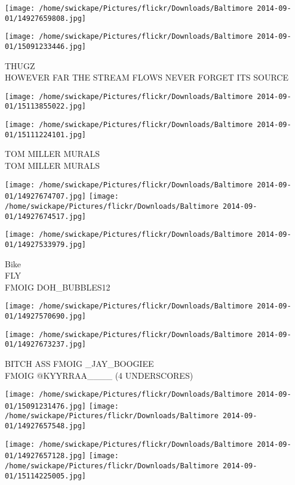 \documentclass[10pt,letterpaper]{article}
\begin{document}
\texttt{[image: /home/swickape/Pictures/flickr/Downloads/Baltimore 2014-09-01/14927659808.jpg]}

\vspace{0.25in}
\texttt{[image: /home/swickape/Pictures/flickr/Downloads/Baltimore 2014-09-01/15091233446.jpg]}

THUGZ\\
HOWEVER FAR THE STREAM FLOWS NEVER FORGET ITS SOURCE
\pagebreak

\texttt{[image: /home/swickape/Pictures/flickr/Downloads/Baltimore 2014-09-01/15113855022.jpg]}

\vspace{0.25in}
\texttt{[image: /home/swickape/Pictures/flickr/Downloads/Baltimore 2014-09-01/15111224101.jpg]}

TOM MILLER MURALS\\
TOM MILLER MURALS
\pagebreak

\texttt{[image: /home/swickape/Pictures/flickr/Downloads/Baltimore 2014-09-01/14927674707.jpg]}
\texttt{[image: /home/swickape/Pictures/flickr/Downloads/Baltimore 2014-09-01/14927674517.jpg]}

\vspace{0.25in}
\texttt{[image: /home/swickape/Pictures/flickr/Downloads/Baltimore 2014-09-01/14927533979.jpg]}

Bike\\
FLY\\
FMOIG DOH\_BUBBLES12
\pagebreak

\texttt{[image: /home/swickape/Pictures/flickr/Downloads/Baltimore 2014-09-01/14927570690.jpg]}

\vspace{0.25in}
\texttt{[image: /home/swickape/Pictures/flickr/Downloads/Baltimore 2014-09-01/14927673237.jpg]}

BITCH ASS FMOIG \_JAY\_BOOGIEE\\
FMOIG @KYYRRAA\_\_\_\_ (4 UNDERSCORES)
\pagebreak

\texttt{[image: /home/swickape/Pictures/flickr/Downloads/Baltimore 2014-09-01/15091231476.jpg]}
\texttt{[image: /home/swickape/Pictures/flickr/Downloads/Baltimore 2014-09-01/14927657548.jpg]}

\texttt{[image: /home/swickape/Pictures/flickr/Downloads/Baltimore 2014-09-01/14927657128.jpg]}
\texttt{[image: /home/swickape/Pictures/flickr/Downloads/Baltimore 2014-09-01/15114225005.jpg]}
\end{document}
